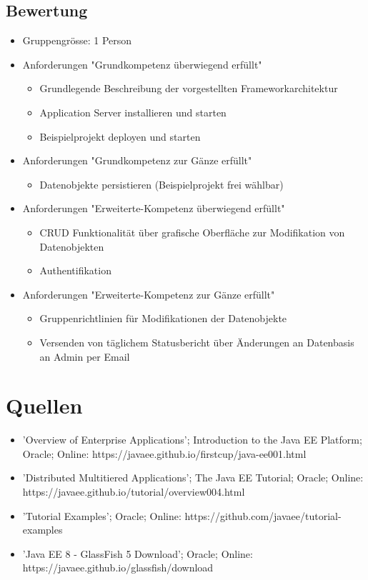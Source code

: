 \subsection{Bewertung}

\begin{itemize}
    \item Gruppengrösse: 1 Person
    \item Anforderungen "Grundkompetenz überwiegend erfüllt"
    \begin{itemize}
        \item Grundlegende Beschreibung der vorgestellten Frameworkarchitektur
        \item Application Server installieren und starten
        \item Beispielprojekt deployen und starten
    \end{itemize}
    \item Anforderungen "Grundkompetenz zur Gänze erfüllt"
    \begin{itemize}
        \item Datenobjekte persistieren (Beispielprojekt frei wählbar)
    \end{itemize}
    \item Anforderungen "Erweiterte-Kompetenz überwiegend erfüllt"
    \begin{itemize}
        \item CRUD Funktionalität über grafische Oberfläche zur Modifikation von Datenobjekten
        \item Authentifikation
    \end{itemize}
    \item Anforderungen "Erweiterte-Kompetenz zur Gänze erfüllt"
    \begin{itemize}
        \item Gruppenrichtlinien für Modifikationen der Datenobjekte
        \item Versenden von täglichem Statusbericht über Änderungen an Datenbasis an Admin per Email
    \end{itemize}
\end{itemize}

\section{Quellen}
\begin{itemize}
	\item 'Overview of Enterprise Applications'; Introduction to the Java EE Platform; Oracle; Online: https://javaee.github.io/firstcup/java-ee001.html
	\item 'Distributed Multitiered Applications'; The Java EE Tutorial; Oracle; Online: https://javaee.github.io/tutorial/overview004.html
	\item 'Tutorial Examples'; Oracle; Online: https://github.com/javaee/tutorial-examples
	\item 'Java EE 8 - GlassFish 5 Download'; Oracle; Online: https://javaee.github.io/glassfish/download
\end{itemize}

\clearpage

